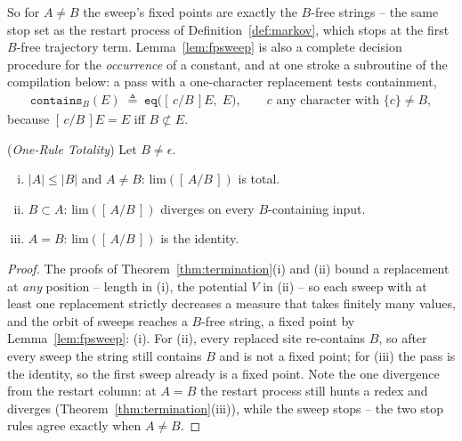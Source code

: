 So for $A \neq B$ the sweep's fixed points are exactly the $B$-free
strings -- the same stop set as the restart process of
Definition~\ref{def:markov}, which stops at the first $B$-free
trajectory term. Lemma~\ref{lem:fpsweep} is also a complete decision
procedure for the \emph{occurrence} of a constant, and at one stroke a
subroutine of the compilation below: a pass with a one-character
replacement tests containment,
\begin{align}
    \mathtt{contains}_B(E) \;\triangleq\; \mathtt{eq}\big([\,c/B\,]E,\; E\big),
    \qquad c \text{ any character with } \{c\} \neq B,
    \label{eq:contains}
\end{align}
because $[\,c/B\,]E = E$ iff $B \not\subset E$.

\begin{proposition}
    (\emph{One-Rule Totality})
    \label{prop:limtotal}
    Let $B \neq \epsilon$.
    \begin{enumerate}[(i)]
        \item $|A| \leq |B|$ and $A \neq B$: $\mathrm{lim}([\,A/B\,])$ is total.
        \item $B \subset A$: $\mathrm{lim}([\,A/B\,])$ diverges on every $B$-containing input.
        \item $A = B$: $\mathrm{lim}([\,A/B\,])$ is the identity.
    \end{enumerate}
\end{proposition}

\begin{proof}
    The proofs of Theorem~\ref{thm:termination}(i) and (ii) bound a
    replacement at \emph{any} position -- length in (i), the potential
    $V$ in (ii) -- so each sweep with at least one replacement strictly
    decreases a measure that takes finitely many values, and the orbit
    of sweeps reaches a $B$-free string, a fixed point by
    Lemma~\ref{lem:fpsweep}: (i). For (ii), every replaced site
    re-contains $B$, so after every sweep the string still contains $B$
    and is not a fixed point; for (iii) the pass is the identity, so the
    first sweep already is a fixed point. Note the one divergence from
    the restart column: at $A = B$ the restart process still hunts a
    redex and diverges (Theorem~\ref{thm:termination}(iii)), while the
    sweep stops -- the two stop rules agree exactly when $A \neq B$.
\end{proof}

